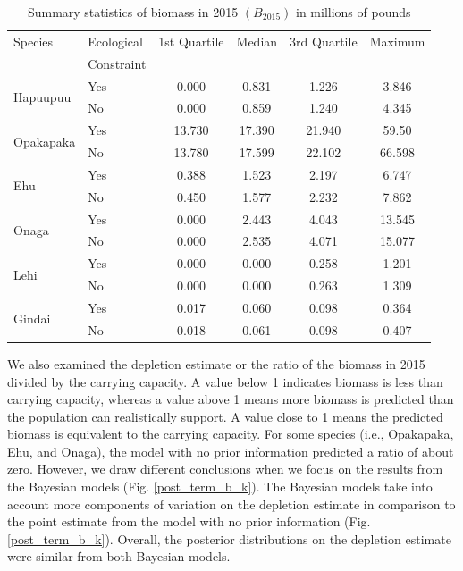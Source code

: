 \documentclass[oneside,12pt,final]{sty/ucthesis-CA2012}
\begin{document}
\begin{mainmatter}
\begin{table}[H]
\centering
\caption{Summary statistics of biomass in 2015 $(B_{2015})$ in millions of pounds}
\begin{tabular}{llcccc}
  \hline 
 Species & Ecological  &  1st Quartile &  Median   & 3rd Quartile  &  Maximum \\
 & Constraint &&&&\\ 
   \hline
\multirow{2}{*}{Hapuupuu} & Yes    & 0.000   & 0.831   &  1.226   & 3.846
 \\
 						  & No  &  0.000   & 0.859     & 1.240  &  4.345
 \\
   \hline
\multirow{2}{*}{Opakapaka}& Yes    & 13.730  &  17.390   &  21.940  &  59.50 
 \\
						  & No  &  13.780   & 17.599  &   22.102  & 66.598 
 \\
   \hline
\multirow{2}{*}{Ehu}  & Yes  & 0.388   &  1.523    &   2.197  & 6.747 
 \\
					  & No   &  0.450  &  1.577   &   2.232  &  7.862
 \\
   \hline
\multirow{2}{*}{Onaga} & Yes  & 0.000   &  2.443      &  4.043  & 13.545  
 \\
					   & No &   0.000 &    2.535     &  4.071 & 15.077
 \\
   \hline
\multirow{2}{*}{Lehi}  & Yes   & 0.000   & 0.000   &  0.258 & 1.201 
 \\
					   & No  & 0.000  &  0.000    &  0.263  & 1.309
\\
   \hline
\multirow{2}{*}{Gindai} & Yes &  0.017  & 0.060  &  0.098 & 0.364
 \\
						& No  & 0.018 &  0.061 &  0.098 & 0.407 
 \\
   \hline
\end{tabular} 
\label{summary_term_bio}
\end{table}
 
 We also examined the depletion estimate or the ratio of the biomass in 2015 divided by the carrying capacity. A value below 1 indicates biomass is less than carrying capacity, whereas a value above 1 means more biomass is predicted than the population can realistically support. A value close to 1 means the predicted biomass is equivalent to the carrying capacity. For some species (i.e., Opakapaka, Ehu, and Onaga), the model with no prior information predicted a ratio of about zero. However, we draw different conclusions when we focus on the results from the Bayesian models (Fig. \ref{post_term_b_k}). The Bayesian models take into account more components of variation on the depletion estimate in comparison to the point estimate from the model with no prior information (Fig. \ref{post_term_b_k}). Overall, the posterior distributions on the depletion estimate were similar from both Bayesian models.
 

\end{mainmatter}
\end{document}
